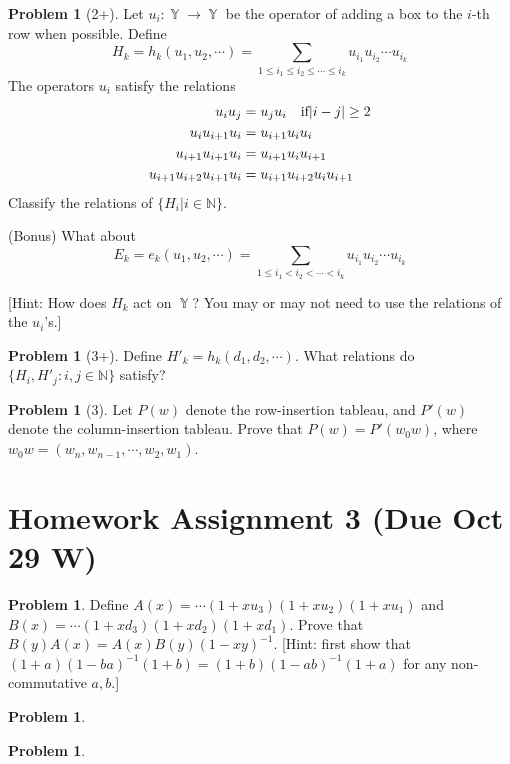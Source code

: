 \documentclass{amsart}
\theoremstyle{plain}
\theoremstyle{definition}
\newtheorem{problem}[theorem]{Problem}
\DeclareMathOperator{\YY}{\mathbb{Y}}
\begin{document}
\begin{problem}[2+]
	Let $u_i:\YY\to \YY$ be the operator of adding a box to the $i$-th row when possible. Define 
	\[H_k=h_k(u_1,u_2,\cdots)=\sum_{1\leq i_1\leq i_2\leq\cdots\leq i_k}u_{i_1}u_{i_2}\cdots u_{i_k}\]
	The operators $u_i$ satisfy the relations 
	\begin{align*}
	u_iu_j&=u_ju_i\text{\quad if}|i-j|\geq 2\\
	u_iu_{i+1}u_i&=u_{i+1}u_iu_i\\
	u_{i+1}u_{i+1}u_i&=u_{i+1}u_iu_{i+1}\\
	u_{i+1}u_{i+2}u_{i+1}u_i&=u_{i+1}u_{i+2}u_iu_{i+1}	
	\end{align*}
	Classify the relations of $\{H_i|i\in\mathbb{N}\}$.
	
	(Bonus) What about 
	$$E_k=e_k(u_1,u_2,\cdots)=\sum_{1\leq i_1<i_2<\cdots<i_k}u_{i_1}u_{i_2}\cdots u_{i_k}$$
	
	
[Hint: How does $H_k$ act on $\YY$? You may or may not need to use the relations of the $u_i$'s.] 
\end{problem}
\begin{problem}[3+]
	
	Define $H'_k=h_k(d_1,d_2,\cdots)$. What relations do $\{H_i,H'_j:i,j\in\mathbb{N}\}$ satisfy?
\end{problem}
\begin{problem}[3]
	Let $P(w)$ denote the row-insertion tableau, and $P'(w)$ denote the column-insertion tableau. Prove that $P(w)=P'(w_0w)$, where $w_0w=(w_n,w_{n-1},\cdots,w_2,w_1)$.
\end{problem}


	
	\section{Homework Assignment 3 (Due Oct 29 W)}
	\begin{problem}
	Define $A(x)=\cdots (1+x u_3)(1+x u_2)(1+x u_1)$ and $B(x)=\cdots (1+x d_3)(1+x d_2)(1+x d_1)$. Prove that $B(y)A(x)=A(x)B(y)(1-xy)^{-1}$. 
	[Hint: first show that $(1+a)(1-ba)^{-1}(1+b)=(1+b)(1-ab)^{-1}(1+a)$ for any non-commutative $a,b$.]
\end{problem}
\begin{problem}
	
\end{problem}
\begin{problem}
	
\end{problem}
\end{document}
